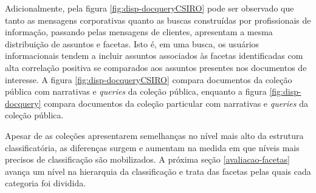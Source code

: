 Adicionalmente, pela figura \ref{fig:disp-docqueryCSIRO} pode ser observado que tanto as mensagens corporativas quanto as buscas construídas por profissionais de informação, passando pelas mensagens de clientes, apresentam a mesma distribuição de assuntos e facetas. Isto é, em uma busca, os usuários informacionais tendem a incluir assuntos associados às facetas identificadas com alta correlação positiva se comparados aos assuntos presentes nos documentos de interesse. A figura \ref{fig:disp-docqueryCSIRO} compara documentos da coleção pública com narrativas e \textit{queries} da coleção pública, enquanto a figura \ref{fig:disp-docquery} compara documentos da coleção particular com narrativas e \textit{queries} da coleção pública.





%
%
%
%
%
%
%
%
%
%
%
%
%
%
%
%
%
%
%
%
%
%
%
%
%
%
%
%
%


Apesar de as coleções apresentarem semelhanças no nível mais alto da estrutura classificatória, as diferenças surgem e aumentam na medida em que níveis mais precisos de classificação são mobilizados. A próxima seção \ref{avaliacao-facetas} avança um nível na hierarquia da classificação e trata das facetas pelas quais cada categoria foi dividida.



